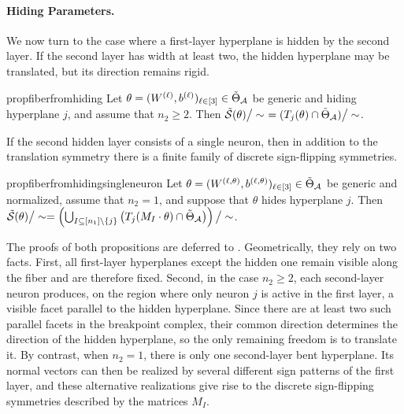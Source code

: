 \documentclass{article}
\theoremstyle{definition}
\newcommand{\architecture}{\mathcal{A}}
\newcommand{\gparamspace}[1]{\Tilde{\Theta}_{#1}}
\newcommand{\weights}[1]{W^{(#1)}}
\newcommand{\bias}[1]{b^{(#1)}}
\newcommand{\gfiber}[1]{\Tilde{\mathcal{S}}({#1})}
\newcommand{\modulo}[1]{\big/#1}
\begin{document}
\paragraph{Hiding Parameters.}

We now turn to the case where a first-layer hyperplane is hidden by the second layer. 
If the second layer has width at least two, the hidden hyperplane may be translated, but its direction remains rigid.

\begin{restatable}{prop}{fiberfromhiding}
\label{prop:fiber_from_hiding}
Let $\theta = (\weights{\ell},\bias{\ell})_{\ell \in [3]} \in \gparamspace{\architecture}$ be generic and hiding hyperplane $j$, and assume that $n_2 \geq 2$. 
Then $
\gfiber{\theta} \modulo{\sim}\  = (T_j(\theta)\cap \gparamspace{\architecture}) \modulo{\sim}
$.   
\end{restatable}

If the second hidden layer consists of a single neuron, then in addition to the translation symmetry there is a finite family of discrete sign-flipping symmetries. 
%
\begin{restatable}{prop}{fiberfromhidingsingleneuron}
\label{prop:hiding_fiber_single_second_layer}
Let $\theta = (\weights{\ell,\theta},\bias{\ell,\theta})_{\ell \in [3]} \in \gparamspace{\architecture}$ be generic and normalized, assume that $n_2=1$, and suppose that $\theta$ hides hyperplane $j$. Then
$
\gfiber{\theta}\modulo{\sim}
=
\left(
\bigcup_{I \subseteq [n_1]\setminus \{j\}}
\left(T_j(M_I \cdot \theta)\cap \gparamspace{\architecture}\right)
\right)\modulo{\sim}
$. 
\end{restatable}


The proofs of both propositions are deferred to . Geometrically, they rely on two facts. First, all first-layer hyperplanes except the hidden one remain visible along the fiber and are therefore fixed. Second, in the case $n_2\ge 2$, each second-layer neuron produces, on the region where only neuron $j$ is active in the first layer, a visible facet parallel to the hidden hyperplane. Since there are at least two such parallel facets in the breakpoint complex, their common direction determines the direction of the hidden hyperplane, so the only remaining freedom is to translate it. By contrast, when $n_2=1$, there is only one second-layer bent hyperplane. Its normal vectors can then be realized by several different sign patterns of the first layer, and these alternative realizations give rise to the discrete sign-flipping symmetries described by the matrices $M_I$.
\end{document}

